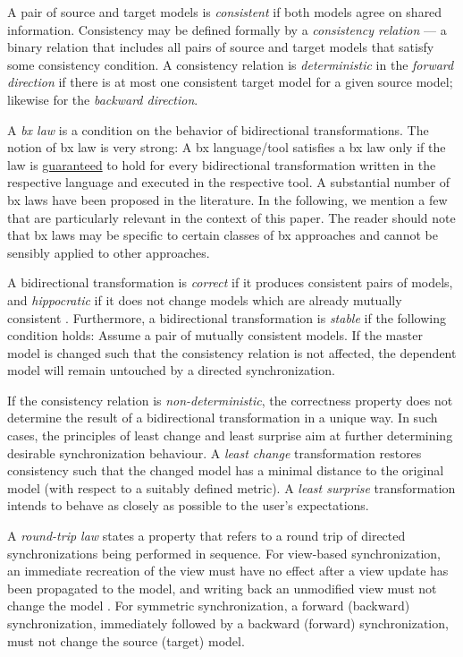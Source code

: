 A pair of source and target models is \emph{consistent} if both models agree on shared information. Consistency may be defined formally by a \emph{consistency relation} --- a binary relation that includes all pairs of source and target models that satisfy some consistency condition. A consistency relation is \emph{deterministic} in the \emph{forward direction} if there is at most one consistent target model for a given source model; likewise for the \emph{backward direction}. 

A \emph{bx law} is a condition on the behavior of bidirectional transformations. The notion of bx law is very strong: A bx language/tool satisfies a bx law only if the law is \underline{guaranteed} to hold for every bidirectional transformation written in the respective language and executed in the respective tool. A substantial number of bx laws have been proposed in the literature. 
In the following, we mention a few that are particularly relevant in the context of this paper. The reader should note that bx laws may be specific to certain classes of bx approaches and cannot be sensibly applied to other approaches.

A bidirectional transformation is \emph{correct} if it produces consistent pairs of models, and \emph{hippocratic} if it does not change models which are already mutually consistent \cite{SOSYM-Stevens2010}. Furthermore, a bidirectional transformation is \emph{stable} \cite{DBLP:journals/corr/PachecoMCV13} if the following condition holds: Assume a pair of mutually consistent models. If the master model is changed such that the consistency relation is not affected, the dependent model will remain untouched by a directed synchronization.
 
If the consistency relation is \emph{non-deter\-min\-is\-tic}, the correctness property does not determine the result of a bidirectional transformation in a unique way. 
In such cases, the principles of least change and least surprise aim at further determining desirable synchronization behaviour. 
A \emph{least change} transformation \cite{SOSYM-Macedo2016} restores consistency such that the changed model has a minimal distance to the original model (with respect to a suitably defined metric). 
A \emph{least surprise} transformation \cite{Cheney2015} intends to behave as closely as possible to the user's expectations.

A \emph{round-trip law} states a property that refers to a round trip of directed synchronizations being performed in sequence. 
For view-based synchronization, an immediate recreation of the view must have no effect after a view update has been propagated to the model, and writing back an unmodified view must not change the model \cite{TOPLAS2007-Foster}. 
For symmetric synchronization, a forward (backward) synchronization, immediately followed by a backward (forward) synchronization, must not change the source (target) model.

